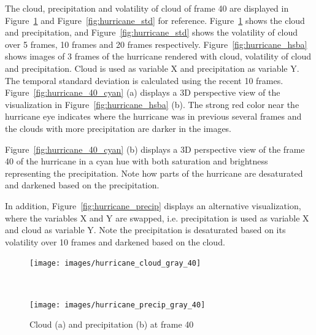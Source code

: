 The cloud, precipitation and volatility of cloud of frame 40 are displayed in Figure~\ref{fig:hurricane_gray} and Figure~\ref{fig:hurricane_std} for reference.
Figure~\ref{fig:hurricane_gray} shows the cloud and precipitation, and Figure~\ref{fig:hurricane_std} shows the volatility of cloud over 5 frames, 10 frames and 20 frames respectively.
Figure~\ref{fig:hurricane_hsba} shows images of 3 frames of the hurricane rendered with cloud, volatility of cloud and precipitation. Cloud is used as variable X and precipitation as variable Y. The temporal standard deviation is calculated using the recent 10 frames.
Figure~\ref{fig:hurricane_40_cyan} (a) displays a 3D perspective view of the visualization in Figure~\ref{fig:hurricane_hsba} (b).
The strong red color near the hurricane eye indicates where the hurricane was in previous several frames and the clouds with more precipitation are darker in the images.

Figure~\ref{fig:hurricane_40_cyan} (b) displays a 3D perspective view of the frame 40 of the hurricane in a cyan hue with both saturation and brightness representing the precipitation. Note how parts of the hurricane are desaturated and darkened based on the precipitation.

In addition, Figure~\ref{fig:hurricane_precip} displays an alternative visualization, where the variables X and Y are swapped, i.e. precipitation is used as variable X and cloud as variable Y. Note the precipitation is desaturated based on its volatility over 10 frames and darkened based on the cloud.

\begin{figure}
\centering
\begin{minipage}{.33\textwidth}
\texttt{[image: images/hurricane\_cloud\_gray\_40]}
\subcaption{}
\end{minipage}~
\begin{minipage}{.33\textwidth}
\texttt{[image: images/hurricane\_precip\_gray\_40]}
\subcaption{}
\end{minipage}
\caption{Cloud (a) and precipitation (b) at frame 40}
\label{fig:hurricane_gray}
\end{figure}

